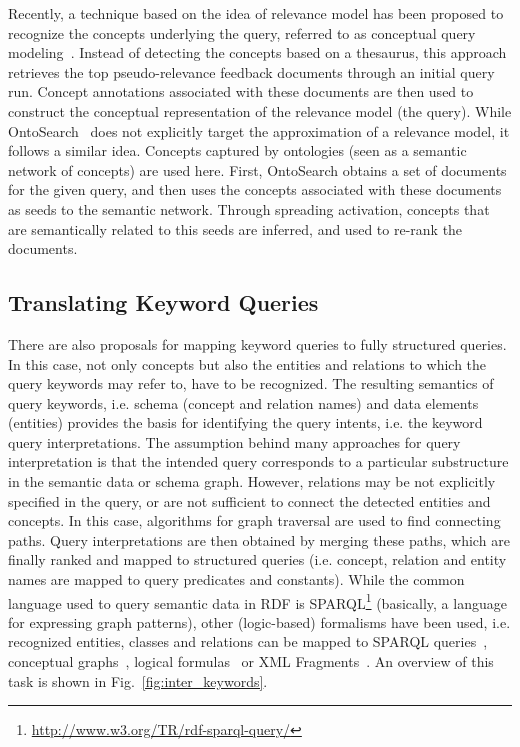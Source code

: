 Recently, a technique based on the idea of relevance model has been proposed to recognize the concepts underlying the query, referred to as conceptual query modeling~\cite{DBLP:journals/ipm/MeijTRK10}. Instead of detecting the concepts based on a thesaurus, this approach retrieves the top pseudo-relevance feedback documents through an initial query run. Concept annotations associated with these documents are then used to construct the conceptual representation of the relevance model (the query). While OntoSearch~\cite{DBLP:conf/aaai/JiangT06} does not explicitly target the approximation of a relevance model, it follows a similar idea. Concepts captured by ontologies (seen as a semantic network of concepts) are used here.  First, OntoSearch obtains a set of documents for the given query, and then uses the concepts associated with these documents as seeds to the semantic network. Through spreading activation, concepts that are semantically related to this seeds are inferred, and used to re-rank the documents. 
	
\subsection{Translating Keyword Queries} 
There are also proposals for mapping keyword queries to fully structured queries. In this case, not only concepts but also the entities and relations to which the query keywords may refer to, have to be recognized. The resulting semantics of query keywords, i.e. schema (concept and relation names) and data elements (entities) provides the basis for identifying the query intents, i.e. the keyword query interpretations. The assumption behind many approaches for query interpretation is that the intended query corresponds to a particular substructure in the semantic data or schema graph. However, relations may be not explicitly specified in the query, or are not sufficient to connect the detected entities and concepts. In this case, algorithms for graph traversal are used to find connecting paths. Query interpretations are then obtained by merging these paths, which are finally ranked and mapped to structured queries (i.e. concept, relation and entity names are mapped to query predicates and constants). While the common language used to query semantic data in RDF is SPARQL\footnote{\url{http://www.w3.org/TR/rdf-sparql-query/}} (basically, a language for expressing graph patterns), other (logic-based) formalisms have been used, i.e. recognized entities, classes and relations can be mapped to SPARQL queries~\cite{DBLP:conf/esws/DamljanovicAC10}, 
conceptual graphs~\cite{DBLP:conf/aswc/CaoCT08}, logical formulas~\cite{DBLP:journals/dke/CimianoHHMS08} or XML Fragments~\cite{DBLP:conf/sigir/Chu-CarrollPCFD06}. An overview of this task is shown in Fig.~\ref{fig:inter_keywords}.

